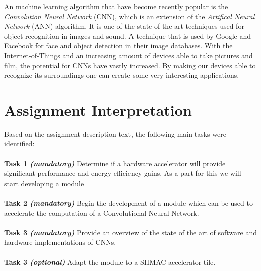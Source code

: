 An machine learning algorithm that have become recently popular is the \textit{Convolution Neural Network} (CNN), which is an extension of the \textit{Artifical Neural Network} (ANN) algorithm. It is one of the state of the art techniques used for object recognition in images and sound. A technique that is used by Google and Facebook for face and object detection in their image databases. With the Internet-of-Things and an increasing amount of devices able to take pictures and film, the potential for CNNs have vastly increased. By making our devices able to recognize its surroundings one can create some very interesting applications.


\section{Assignment Interpretation}

Based on the assignment description text, the following main tasks were
identified:\\ \hfil \\ \hfil
\textbf{Task 1 \textit{(mandatory)}} Determine if a hardware accelerator will provide significant performance and energy-efficiency gains. As a part for this we will start developing a module  \\ \hfil \\ \hfil
\textbf{Task 2 \textit{(mandatory)}} Begin the development of a module which can be used to accelerate the computation of a Convolutional Neural Network.\\ \hfil \\ \hfil
\textbf{Task 3 \textit{(mandatory)}} Provide an overview of the state of the art of software and hardware implementations of CNNs. \\ \hfil \\ \hfil
\textbf{Task 3 \textit{(optional)}} Adapt the module to a SHMAC accelerator tile. \\ \hfil \\ \hfil



